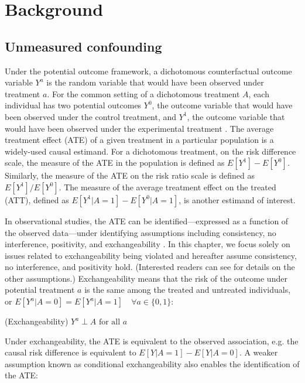 \section{Background}
\label{sec:nco_background}

\subsection{Unmeasured confounding}

Under the potential outcome framework, a dichotomous counterfactual outcome variable $Y^a$ is the random variable that would have been observed under treatment $a$. For the common setting of a dichotomous treatment $A$, each individual has two potential outcomes $Y^{0}$, the outcome variable that would have been observed under the control treatment, and $Y^{1}$, the outcome variable that would have been observed under the experimental treatment \cite{hernan2010causal}. The average treatment effect (ATE) of a given treatment in a particular population is a widely-used causal estimand. For a dichotomous treatment, on the risk difference scale, the measure of the ATE in the population is defined as $E[Y^{1}] - E[Y^{0}]$. Similarly, the measure of the ATE on the risk ratio scale is defined as $E[Y^{1}] / E[Y^{0}]$. The measure of the average treatment effect on the treated (ATT), defined as $E[Y^{1}|A=1] - E[Y^{0}|A=1]$, is another estimand of interest.

In observational studies, the ATE can be identified---expressed as a function of the observed data---under identifying assumptions including consistency, no interference, positivity, and exchangeability \cite{naimi2023defining}. In this chapter, we focus solely on issues related to exchangeability being violated and hereafter assume consistency, no interference, and positivity hold. (Interested readers can see \cite{hernan2010causal, naimi2023defining} for details on the other assumptions.) Exchangeability means that the risk of the outcome under potential treatment $a$ is the same among the treated and untreated individuals, or $E[Y^a|A=0] = E[Y^a|A=1] \quad \forall a \in \{0, 1\}$:

\begin{assumption} (Exchangeability) \label{as:exchangeability}
  $Y^a \perp A \text{ for all } a$
\end{assumption}

Under exchangeability, the ATE is equivalent to the observed association,  e.g. the causal risk difference is equivalent to $E[Y | A = 1] - E[Y | A = 0]$. A weaker assumption known as conditional exchangeability also enables the identification of the ATE:

